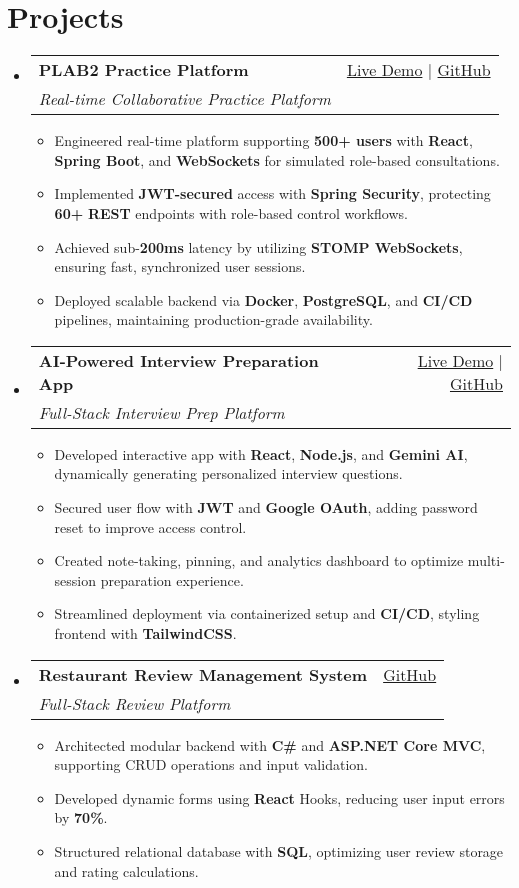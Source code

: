 \documentclass[letterpaper,11pt]{article}
\makeatletter
\newcommand{\resumeItem}[1]{\item\small{#1 \vspace{-2pt}}}
\newcommand{\resumeSubheading}[4]{
  \vspace{-1pt}\item
    \begin{tabular*}{0.97\textwidth}[t]{l@{\extracolsep{\fill}}r}
      \textbf{#1} & #2 \\
      \textit{\small#3} & \textit{\small #4} \\
    \end{tabular*}\vspace{-5pt}
}
\newcommand{\resumeSubHeadingListStart}{\begin{itemize}[leftmargin=*]}
\newcommand{\resumeSubHeadingListEnd}{\end{itemize}}
\newcommand{\resumeItemListStart}{\begin{itemize}}
\newcommand{\resumeItemListEnd}{\end{itemize}\vspace{-5pt}}
\makeatother
\begin{document}
\section{Projects}
  \resumeSubHeadingListStart
    \resumeSubheading
      {\textbf{PLAB2 Practice Platform}}{\href{https://plab2practice.com}{Live Demo} | \href{https://github.com/altansaid/plab2projectnew}{GitHub}}
      {Real-time Collaborative Practice Platform}{}
      \resumeItemListStart
        \resumeItem{Engineered real-time platform supporting \textbf{500+ users} with \textbf{React}, \textbf{Spring Boot}, and \textbf{WebSockets} for simulated role-based consultations.}
        \resumeItem{Implemented \textbf{JWT-secured} access with \textbf{Spring Security}, protecting \textbf{60+} \textbf{REST} endpoints with role-based control workflows.}
        \resumeItem{Achieved sub-\textbf{200ms} latency by utilizing \textbf{STOMP WebSockets}, ensuring fast, synchronized user sessions.}
        \resumeItem{Deployed scalable backend via \textbf{Docker}, \textbf{PostgreSQL}, and \textbf{CI/CD} pipelines, maintaining production-grade availability.}
      \resumeItemListEnd

    \resumeSubheading
      {\textbf{AI-Powered Interview Preparation App}}{\href{https://interviewcoach-ai.vercel.app}{Live Demo} | \href{https://github.com/altansaid/interviewcoach-ai}{GitHub}}
      {Full-Stack Interview Prep Platform}{}
      \resumeItemListStart
        \resumeItem{Developed interactive app with \textbf{React}, \textbf{Node.js}, and \textbf{Gemini AI}, dynamically generating personalized interview questions.}
        \resumeItem{Secured user flow with \textbf{JWT} and \textbf{Google OAuth}, adding password reset to improve access control.}
        \resumeItem{Created note-taking, pinning, and analytics dashboard to optimize multi-session preparation experience.}
        \resumeItem{Streamlined deployment via containerized setup and \textbf{CI/CD}, styling frontend with \textbf{TailwindCSS}.}
      \resumeItemListEnd

    \resumeSubheading
      {\textbf{Restaurant Review Management System}}{\href{https://github.com/altansaid/restaurantreviewmanagementsystem}{GitHub}}{Full-Stack Review Platform}{}
      \resumeItemListStart
        \resumeItem{Architected modular backend with \textbf{C\#} and \textbf{ASP.NET Core MVC}, supporting CRUD operations and input validation.}
        \resumeItem{Developed dynamic forms using \textbf{React} Hooks, reducing user input errors by \textbf{70\%}.}
        \resumeItem{Structured relational database with \textbf{SQL}, optimizing user review storage and rating calculations.}
      \resumeItemListEnd
  \resumeSubHeadingListEnd
\end{document}
